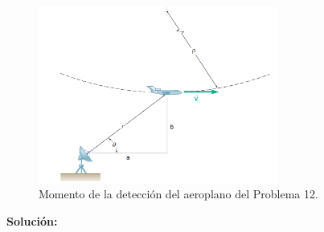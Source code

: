 \documentclass[a4paper,11pt]{scrartcl}
\begin{document}
\begin{figure}[h!]
  \centering
  \includegraphics[width=0.7\textwidth]{12_1}
  \caption{Momento de la detección del aeroplano del Problema 12.}
  \label{fig:12_1}
\end{figure}

\textbf{Solución:}
\end{document}
